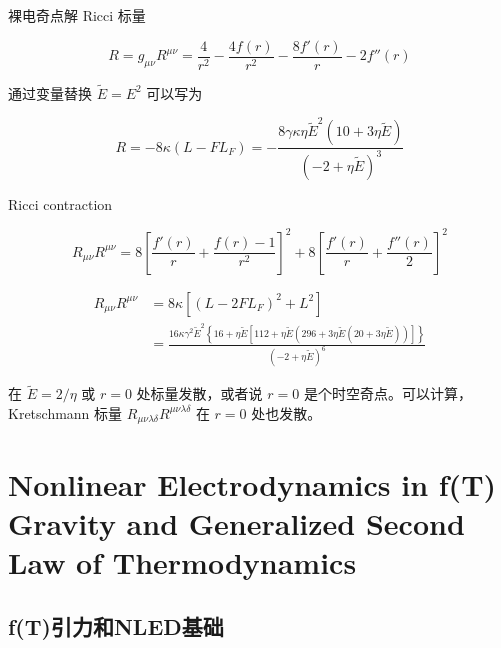 \documentclass[9pt, dvipsnames]{beamer} %
\begin{document}
\begin{frame}{裸电奇点解}
    Ricci  标量

    $$
    R
    =g_{\mu\nu} R^{\mu\nu}
    =\frac{4 }{r^2 } - \frac{4f(r) }{r^2 } - \frac{8f'(r) }{r } - 2f''(r) 
    $$

    通过变量替换 $\tilde{E}=E^2$ 可以写为
    
    $$
    R
    =-8\kappa \left(L-FL_F \right)
    =-\frac{8\gamma\kappa \eta\tilde{E}^2\left(10+3\eta\tilde{E} \right) }{\left(-2+\eta\tilde{E} \right)^3 }
    $$
    
    Ricci contraction
    
    $$
    R_{\mu\nu} R^{\mu\nu}
    =8\left[\frac{f'(r) }{r } + \frac{f(r)-1 }{r^2 }  \right]^2 + 8 \left[\frac{f'(r) }{r } + \frac{f''(r) }{2 }  \right]^2
    $$
    
    $$
    \begin{aligned}
        R_{\mu\nu} R^{\mu\nu}
        &=8\kappa\left[\left(L - 2FL_F \right)^2 + L^2 \right] \\
        &=\frac{16\kappa \gamma^2 \tilde{E}^2 \left\{16+\eta \tilde{E}\left[112+\eta\tilde{E}\left(296+3\eta \tilde{E}\left(20+3\eta\tilde{E} \right) \right) \right] \right\} }{\left(-2+\eta\tilde{E} \right)^6 }
    \end{aligned}
    $$ 
\end{frame}

\begin{frame}
    在 $\tilde{E}=2/\eta $ 或 $r=0$ 处标量发散，或者说 $r=0$ 是个时空奇点。可以计算，Kretschmann 标量 $R_{\mu\nu\lambda\delta}R^{\mu\nu\lambda\delta}  $ 在 $r=0$ 处也发散。
\end{frame}

\section{Nonlinear Electrodynamics in f(T) Gravity and Generalized Second Law of Thermodynamics}

\subsection{f(T)引力和NLED基础}
\end{document}
